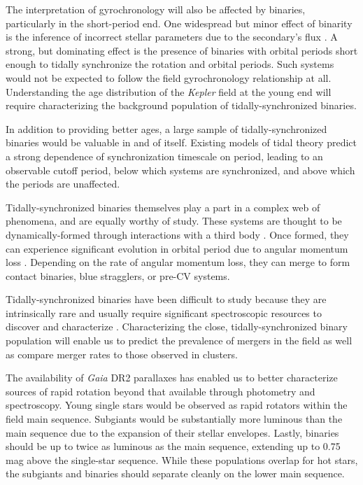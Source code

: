 \documentclass[manuscript]{aastex6}
\newcommand{\Kepler}{\mbox{\textit{Kepler}}}
\newcommand{\Gaia}{\mbox{\textit{Gaia}}}
\begin{document}
The interpretation of gyrochronology will also be affected by binaries,
particularly in the short-period end. One widespread but minor effect of
binarity is the inference of incorrect stellar parameters due to the 
secondary's flux \citep{ElBadry18a,Jackson18}. A strong, but dominating effect
is the presence of binaries with orbital periods short enough to tidally 
synchronize the rotation and orbital periods. Such systems would not be 
expected to follow the field gyrochronology relationship at all.  
Understanding the age distribution of the \Kepler{} field at the young end 
will require characterizing the background population of tidally-synchronized 
binaries.

In addition to providing better ages, a large sample of tidally-synchronized
binaries would be valuable in and of itself. Existing models of tidal
theory \citep{Zahn77} predict a strong dependence of synchronization timescale
on period, leading to an observable cutoff period, below which systems are
synchronized, and above which the periods are unaffected. 

Tidally-synchronized binaries themselves play a part in a complex web of
phenomena, and are equally worthy of study. These systems are thought to be
dynamically-formed through interactions with a third body
\citep{Tokovinin06, Fabrycky07}. Once formed, they can experience significant
evolution in orbital period due to angular momentum loss \citep{Andronov06}.
Depending on the rate of angular momentum loss, they can merge to form contact
binaries, blue stragglers, or pre-CV systems.

Tidally-synchronized binaries have been difficult to study because they are 
intrinsically rare and usually require significant spectroscopic resources 
to discover and characterize \citep{Mathieu90, Raghavan10, Geller15}. 
Characterizing the close, tidally-synchronized binary population will enable 
us to predict the prevalence of mergers in the field as well as compare merger
rates to those observed in clusters.

The availability of \Gaia{} DR2 parallaxes \citep{Gaia18,Lindegren18} has
enabled us to better characterize sources of rapid rotation beyond that
available through photometry and spectroscopy. Young single stars would be
observed as rapid rotators within the field main sequence. Subgiants would be
substantially more luminous than the main sequence due to the expansion of
their stellar envelopes. Lastly, binaries should be up to twice as luminous as
the main sequence, extending up to 0.75 mag above the single-star sequence.
While these populations overlap for hot stars, the subgiants and binaries
should separate cleanly on the lower main sequence.
\end{document}
